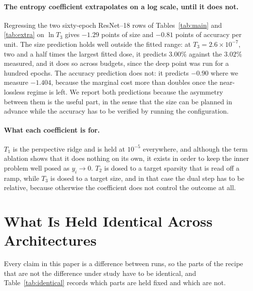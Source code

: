 \documentclass{article}
\begin{document}
\paragraph{The entropy coefficient extrapolates on a log scale, until it does not.}
Regressing the two sixty-epoch ResNet--18 rows of Tables~\ref{tab:main} and
\ref{tab:extra} on $\ln T_3$ gives $-1.29$ points of size and $-0.81$ points of
accuracy per unit. The size prediction holds well outside the fitted range: at
$T_3=2.6\times10^{-7}$, two and a half times the largest fitted dose, it predicts
$3.00\%$ against the $3.02\%$ measured, and it does so across budgets, since the
deep point was run for a hundred epochs. The accuracy prediction does not: it
predicts $-0.90$ where we measure $-1.404$, because the marginal cost more than
doubles once the near-lossless regime is left. We report both predictions because the asymmetry between them is the useful
part, in the sense that the size can be planned in advance while the accuracy has
to be verified by running the configuration.

\paragraph{What each coefficient is for.}
$T_1$ is the perspective ridge and is held at $10^{-5}$ everywhere, and although
the term ablation shows that it does nothing on its own, it exists in order to
keep the inner problem well posed as $y_i\to0$. $T_2$ is dosed to a target
sparsity that is read off a ramp, while $T_3$ is dosed to a target size, and in
that case the dual step has to be relative, because otherwise the coefficient
does not control the outcome at all.

\section{What Is Held Identical Across Architectures}
\label{app:consistency}

Every claim in this paper is a difference between runs, so the parts of the
recipe that are not the difference under study have to be identical, and
Table~\ref{tab:identical} records which parts are held fixed and which are not.
\end{document}
